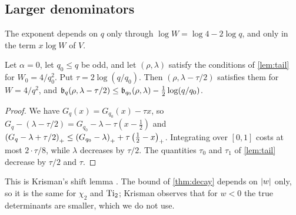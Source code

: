 \subsection{Larger denominators}\label{subsec:shift}

The exponent depends on $q$ only through $\log W=\log4-2\log q$, and only in the term $x\log W$
of $V$.

\begin{proposition}[shift]\label{prop:shift}
Let $\alpha=0$, let $q_0\le q$ be odd, and let $(\rho,\lambda)$ satisfy the conditions of
\cref{lem:tail} for $W_0=4/q_0^2$. Put $\tau=2\log(q/q_0)$. Then $(\rho,\lambda-\tau/2)$
satisfies them for $W=4/q^2$, and
$\mathfrak{b}_q(\rho,\lambda-\tau/2)\le\mathfrak{b}_{q_0}(\rho,\lambda)-\frac12\log(q/q_0)$.
\end{proposition}

\begin{proof}
We have $G_q(x)=G_{q_0}(x)-\tau x$, so $G_q-(\lambda-\tau/2)=G_{q_0}-\lambda-\tau(x-\frac12)$ and
$\left(G_q-\lambda+\tau/2\right)_{+}\le\left(G_{q_0}-\lambda\right)_{+}+\tau\left(\frac12-x\right)_{+}$. Integrating over $[0,1]$
costs at most $2\cdot\tau/8$, while $\lambda$ decreases by $\tau/2$. The quantities $\tau_0$
and $\tau_1$ of \cref{lem:tail} decrease by $\tau/2$ and $\tau$.
\end{proof}

This is Krisman's shift lemma \cite[Lemma~7.1]{Krisman2026chi2}. The bound of
\cref{thm:decay} depends on $\left\lvert w\right\rvert$ only, so it is the same for $\chi_2$ and $\operatorname{Ti}_2$; Krisman
observes \cite[Remark~6.7]{Krisman2026chi2} that for $w<0$ the true determinants are smaller,
which we do not use.
